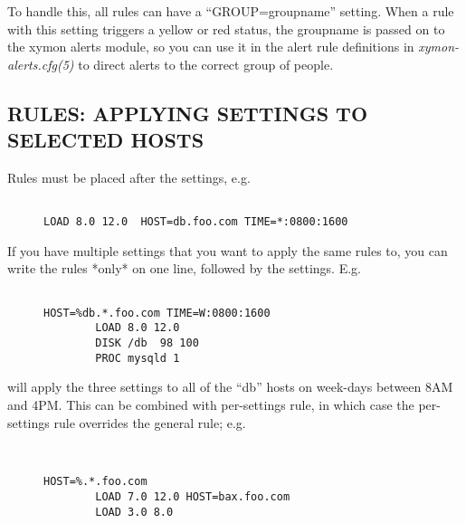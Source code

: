   To handle this, all rules can have a ``GROUP=groupname'' setting. When a rule with this setting triggers a yellow or red status, the groupname is passed on to the xymon alerts module, so you can use it in the alert rule definitions in \emph{xymon-alerts.cfg(5)}
 to direct alerts to the correct group of people. 



 
\subsection{RULES: APPLYING SETTINGS TO SELECTED HOSTS}
 Rules must be placed after the settings, e.g. \begin{description}
\item[]\begin{verbatim}

LOAD 8.0 12.0  HOST=db.foo.com TIME=*:0800:1600

\end{verbatim}


\end{description}



  If you have multiple settings that you want to apply the same rules
  to, you can write the rules *only* on one line, followed by the
  settings. E.g. 

\begin{description}
\item[]\begin{verbatim}

HOST=%db.*.foo.com TIME=W:0800:1600
        LOAD 8.0 12.0
        DISK /db  98 100
        PROC mysqld 1

\end{verbatim}


\end{description}



  will apply the three settings to all of the ``db'' hosts on
  week-days between 8AM and 4PM. This can be combined with
  per-settings rule, in which case the per-settings rule overrides the
  general rule; e.g. \begin{description}\item[]\begin{verbatim}


HOST=%.*.foo.com
        LOAD 7.0 12.0 HOST=bax.foo.com
        LOAD 3.0 8.0

\end{verbatim}


\end{description}



